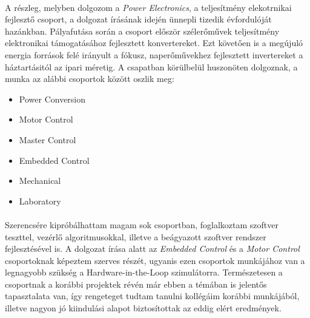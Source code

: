 \paragraph{}
A részleg, melyben dolgozom a \emph{Power Electronics}, a teljesítmény elekotrnikai fejlesztő csoport, a dolgozat írásának idején ünnepli tizedik évfordulóját hazánkban. Pályafutása során a csoport először szélerőművek teljesítmény elektronikai támogatásához fejlesztett konvertereket. Ezt követően is a megújuló energia források felé irányult a fókusz, naperőművekhez fejlesztett invertereket a háztartásitól az ipari méretig. A csapatban körülbelül huszonöten dolgoznak, a munka az alábbi csoportok között oszlik meg:

\begin{itemize}
	\item{Power Conversion}
	\item{Motor Control}
	\item{Master Control}
	\item{Embedded Control}
	\item{Mechanical}
	\item{Laboratory} 
\end{itemize}

\paragraph{}
Szerencsére kipróbálhattam magam sok csoportban, foglalkoztam szoftver teszttel, vezérlő algoritmusokkal, illetve a beágyazott szoftver rendszer fejlesztésével is. A dolgozat írása alatt az \emph{Embedded Control} és a \emph{Motor Control} csoportoknak képeztem szerves részét, ugyanis ezen csoportok munkájához van a legnagyobb szükség a Hardware-in-the-Loop szimulátorra. Természetesen a csoportnak a korábbi projektek révén már ebben a témában is jelentős tapasztalata van, így rengeteget tudtam tanulni kollégáim korábbi munkájából, illetve nagyon jó kiindulási alapot biztosítottak az eddig elért eredmények.




